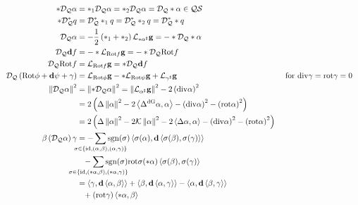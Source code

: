 \documentclass[a4paper,10pt]{scrartcl}
\newcommand{\surf}{\mathcal{S}}
\newcommand{\qts}{\mathcal{Q}\surf}
\newcommand{\gauss}{\mathcal{K}}
\newcommand{\exd}{\mathbf{d}}
\newcommand{\rot}{\mathrm{rot}}
\renewcommand{\div}{\mathrm{div}}
\newcommand{\Rot}{\mathrm{Rot}}
\newcommand{\lie}{\mathcal{L}}
\newcommand{\dq}{\mathcal{D}_{\mathcal{Q}}}
\newcommand{\sgn}{\mathrm{sgn}}
\newcommand{\laplace}[1]{\Delta^{#1}}
\newcommand{\ldivgrad}{\laplace{\textup{dG}}}
\newcommand{\gb}{\mathbf{g}}
\begin{document}
  \begin{align*}
    *\dq\alpha &= *_{1}\dq\alpha = *_{2}\dq\alpha = \dq*\alpha \in \qts \\
    *\dq^{*} q &= \dq^{*} *_{1} q =  \dq^{*} *_{2} q = \dq^{*} * q\\
    \dq\alpha &= -\frac{1}{2}\left( *_{1} + *_{2} \right)\lie_{*\alpha^{\sharp}}\gb = -*\dq*\alpha\\
    \dq\exd f &= -*\lie_{\Rot f}\gb = -*\dq\Rot f \\
    \dq\Rot f &= \lie_{\Rot f}\gb = *\dq\exd f\\
    \dq\left( \Rot \phi + \exd\psi + \gamma \right) &= \lie_{\Rot \phi}\gb - *\lie_{\Rot \psi}\gb + \lie_{\gamma^{\sharp}}\gb
              &&\text{ for }\div\gamma=\rot\gamma=0 \\
    \left\| \dq\alpha \right\|^{2} &= \left\| *\dq\alpha \right\|^{2} = \left\| \lie_{\alpha^{\sharp}}\gb \right\|^{2} - 2\left( \div\alpha \right)^{2}\\
                    &= 2\left( \Delta\left\| \alpha \right\|^{2} - 2\left\langle \ldivgrad\alpha , \alpha \right\rangle 
                                  -\left( \div\alpha \right)^{2} - \left( \rot\alpha \right)^{2}\right)\\
                    &= 2\left( \Delta\left\| \alpha \right\|^{2} -2\gauss\left\| \alpha \right\|^{2} - 2\left\langle \Delta\alpha , \alpha \right\rangle 
                                  -\left( \div\alpha \right)^{2} - \left( \rot\alpha \right)^{2}\right)\\
    \beta\left( \dq\alpha \right)\gamma
          &= -\sum_{\mathclap{\sigma\in\left\{ \textup{id}, \left( \alpha,\beta \right), \left( \alpha,\gamma \right) \right\}}}
                    \sgn(\sigma)\left\langle \sigma(\alpha),\exd\left\langle \sigma(\beta),\sigma(\gamma) \right\rangle \right\rangle\\
          &\hphantom{=}  -\sum_{\mathclap{\sigma\in\left\{ \textup{id}, \left( *\alpha,\beta \right), \left( *\alpha,\gamma \right) \right\}}}
                     \sgn(\sigma) \rot\sigma(*\alpha)\left\langle \sigma(\beta) , \sigma(\gamma) \right\rangle\\
          &= \left\langle \gamma,\exd\left\langle \alpha,\beta \right\rangle \right\rangle
             +\left\langle \beta,\exd\left\langle \alpha,\gamma \right\rangle \right\rangle
             -\left\langle \alpha,\exd\left\langle \beta,\gamma \right\rangle \right\rangle  \\
          &\hphantom{=}   +(\rot\gamma)\left\langle *\alpha,\beta \right\rangle

\end{align*}
\end{document}
